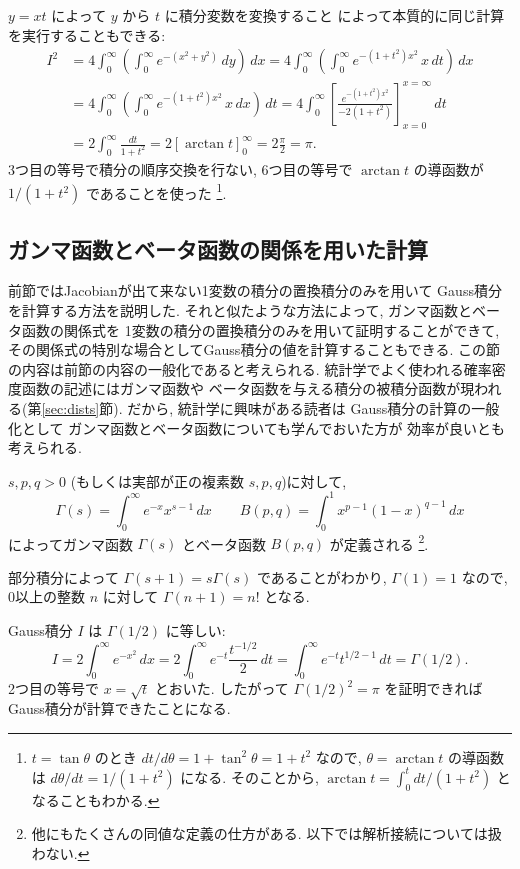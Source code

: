 \documentclass[12pt,twoside]{jarticle}
\theoremstyle{jplain}
\theoremstyle{jplain}
\theoremstyle{jplain}
\numberwithin{theorem}{section}
\numberwithin{equation}{section}
\numberwithin{figure}{section}
\numberwithin{table}{section}
\newcommand\secref[1]{第\ref{#1}節}
\begin{document}
$y=xt$ によって $y$ から $t$ に積分変数を変換すること
によって本質的に同じ計算を実行することもできる:
\begin{align*}
I^2
&=4
\int_0^\infty
\left(
\int_0^\infty e^{-(x^2+y^2)}\,dy
\right)\,dx
=4
\int_0^\infty
\left(
\int_0^\infty e^{-(1+t^2)x^2}\,x \,dt
\right)\,dx
\\ &
=4
\int_0^\infty
\left(
\int_0^\infty e^{-(1+t^2)x^2}\,x \,dx
\right)\,dt
=4
\int_0^\infty\left[\frac{e^{-(1+t^2)x^2}}{-2(1+t^2)}\right]_{x=0}^{x=\infty}\,dt
\\ &
=2
\int_0^\infty\frac{dt}{1+t^2}
=2[\arctan t]_0^\infty
=2\frac{\pi}{2}
=\pi.
\end{align*}
3つ目の等号で積分の順序交換を行ない, 6つ目の等号で $\arctan t$ の導函数が $1/(1+t^2)$
であることを使った%
\footnote{$t=\tan\theta$ のとき $dt/d\theta = 1+\tan^2\theta=1+t^2$ なので,
$\theta=\arctan t$ の導函数は $d\theta/dt = 1/(1+t^2)$ になる.
そのことから, $\arctan t = \int_0^t dt/(1+t^2)$ となることもわかる.}.


\subsection{ガンマ函数とベータ函数の関係を用いた計算}
\label{sec:GaussGamma}

前節ではJacobianが出て来ない1変数の積分の置換積分のみを用いて
Gauss積分を計算する方法を説明した.
それと似たような方法によって,
ガンマ函数とベータ函数の関係式を
1変数の積分の置換積分のみを用いて証明することができて,
その関係式の特別な場合としてGauss積分の値を計算することもできる.
この節の内容は前節の内容の一般化であると考えられる.
統計学でよく使われる確率密度函数の記述にはガンマ函数や
ベータ函数を与える積分の被積分函数が現われる(\secref{sec:dists}).
だから, 統計学に興味がある読者は
Gauss積分の計算の一般化として
ガンマ函数とベータ函数についても学んでおいた方が
効率が良いとも考えられる.

$s,p,q>0$ (もしくは実部が正の複素数 $s,p,q$)に対して,
\[
\Gamma(s)=\int_0^\infty e^{-x}x^{s-1}\,dx
\qquad
B(p,q)=\int_0^1 x^{p-1}(1-x)^{q-1}\,dx
\]
によってガンマ函数 $\Gamma(s)$ とベータ函数 $B(p,q)$ が定義される%
\footnote{他にもたくさんの同値な定義の仕方がある.
以下では解析接続については扱わない.}.

部分積分によって $\Gamma(s+1)=s\Gamma(s)$ であることがわかり,
$\Gamma(1)=1$ なので, 0以上の整数 $n$ に対して $\Gamma(n+1)=n!$ となる.

Gauss積分 $I$ は $\Gamma(1/2)$ に等しい:
\[
I
=2\int_0^\infty e^{-x^2}\,dx
=2\int_0^\infty e^{-t} \frac{t^{-1/2}}{2}\,dt
=\int_0^\infty e^{-t}t^{1/2-1}\,dt
=\Gamma(1/2).
\]
2つ目の等号で $x=\sqrt{t}$ とおいた.
したがって $\Gamma(1/2)^2=\pi$ を証明できれば
Gauss積分が計算できたことになる.
\end{document}
